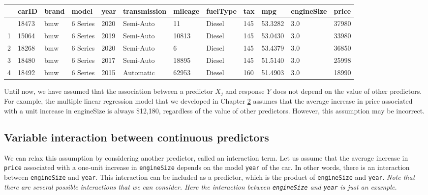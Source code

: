 \documentclass[
  letterpaper,
  DIV=11,
  numbers=noendperiod]{scrreprt}
\begin{document}
\begin{longtable}[]{@{}llllllllllll@{}}
\toprule\noalign{}
& carID & brand & model & year & transmission & mileage & fuelType & tax
& mpg & engineSize & price \\
\midrule\noalign{}
\endhead
\bottomrule\noalign{}
\endlastfoot
0 & 18473 & bmw & 6 Series & 2020 & Semi-Auto & 11 & Diesel & 145 &
53.3282 & 3.0 & 37980 \\
1 & 15064 & bmw & 6 Series & 2019 & Semi-Auto & 10813 & Diesel & 145 &
53.0430 & 3.0 & 33980 \\
2 & 18268 & bmw & 6 Series & 2020 & Semi-Auto & 6 & Diesel & 145 &
53.4379 & 3.0 & 36850 \\
3 & 18480 & bmw & 6 Series & 2017 & Semi-Auto & 18895 & Diesel & 145 &
51.5140 & 3.0 & 25998 \\
4 & 18492 & bmw & 6 Series & 2015 & Automatic & 62953 & Diesel & 160 &
51.4903 & 3.0 & 18990 \\
\end{longtable}

Until now, we have assumed that the association between a predictor
\(X_j\) and response \(Y\) does not depend on the value of other
predictors. For example, the multiple linear regression model that we
developed in Chapter
\href{https://nustat.github.io/STAT303-2-class-notes/Lec2_MultipleLinearRegression.html}{2}
assumes that the average increase in price associated with a unit
increase in engineSize is always \$12,180, regardless of the value of
other predictors. However, this assumption may be incorrect.

\subsection{Variable interaction between continuous
predictors}\label{variable-interaction-between-continuous-predictors}

We can relax this assumption by considering another predictor, called an
interaction term. Let us assume that the average increase in
\texttt{price} associated with a one-unit increase in
\texttt{engineSize} depends on the model \texttt{year} of the car. In
other words, there is an interaction between \texttt{engineSize} and
\texttt{year}. This interaction can be included as a predictor, which is
the product of \texttt{engineSize} and \texttt{year}. \emph{Note that
there are several possible interactions that we can consider. Here the
interaction between \texttt{engineSize} and \texttt{year} is just an
example.}
\end{document}
